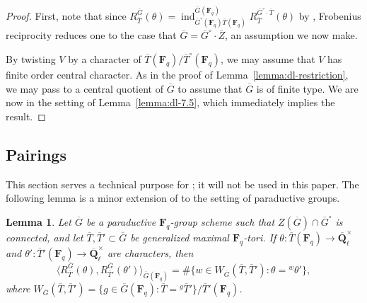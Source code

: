 \documentclass[reqno]{amsart}
\numberwithin{equation}{subsection}
\newcommand{\F}{\mathbf{F}}
\newcommand{\Q}{\mathbf{Q}}
\newcommand{\ol}[1]{\overline{#1}}
\newcommand{\co}{\colon}
\DeclareMathOperator{\ind}{ind}
\newtheorem{lemma}[thm]{Lemma}
\theoremstyle{remark}
\numberwithin{equation}{subsection}
\numberwithin{figure}{subsection}
\begin{document}
\begin{proof}
    First, note that since $R_{\ol T}^{\ol G}(\theta) = \ind_{\ol G^\circ(\F_q) \ol T(\F_q)}^{\ol G(\F_q)} R_{\ol T}^{\ol G^\circ \cdot \ol T}(\theta)$ by \cite[Corollary~2.6.2]{Kal21b}, Frobenius reciprocity reduces one to the case that $\ol G = \ol G^\circ \cdot \ol Z$, an assumption we now make.
    
    By twisting $V$ by a character of $\ol T(\F_q)/\ol T^\circ(\F_q)$, we may assume that $V$ has finite order central character. As in the proof of Lemma~\ref{lemma:dl-restriction}, we may pass to a central quotient of $\ol G$ to assume that $\ol G$ is of finite type. We are now in the setting of Lemma~\ref{lemma:dl-7.5}, which immediately implies the result.
\end{proof}




\subsection{Pairings}

This section serves a technical purpose for \cite{CF26b}; it will not be used in this paper. The following lemma is a minor extension of \cite[Theorem~6.8]{DL76} to the setting of paraductive groups. 

\begin{lemma}\label{lemma:dl-6.8}
    Let $\ol G$ be a paraductive $\F_q$-group scheme such that $Z(\ol G) \cap \ol G^\circ$ is connected, and let $\ol T, \ol T'\subset \ol G$ be generalized maximal $\F_q$-tori. If $\theta\co \ol T(\F_q) \to \ol\Q_\ell^\times$ and $\theta'\co \ol T'(\F_q) \to \ol\Q_\ell^\times$ are characters, then
    \[
    \langle R_{\ol T}^{\ol G}(\theta), R_{\ol T'}^{\ol G}(\theta')\rangle_{\ol G(\F_q)} = \#\{w \in W_{\ol G}(\ol T, \ol T')\co \theta = {}^w\theta'\},
    \]
    where $W_{\ol G}(\ol T, \ol T') = \{g \in \ol G(\F_q)\co \ol T = {}^g\ol T'\}/\ol T'(\F_q)$.
\end{lemma}
\end{document}
